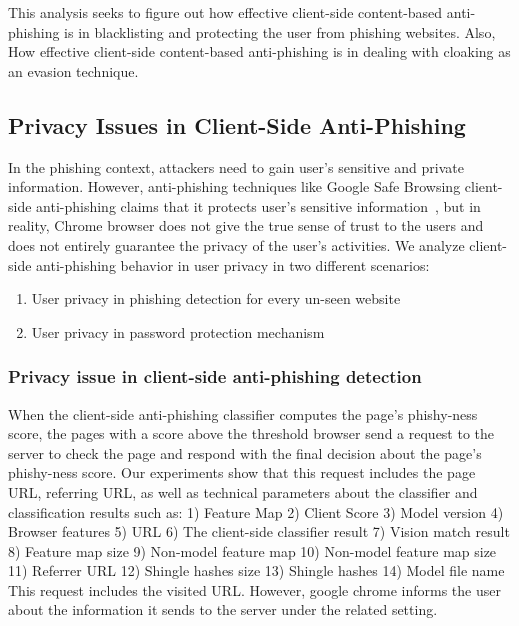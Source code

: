 This analysis seeks to figure out how effective client-side content-based anti-phishing is in blacklisting and protecting the user from phishing websites. Also, How effective client-side content-based anti-phishing is in dealing with cloaking as an evasion technique.

\subsection{Privacy Issues in Client-Side Anti-Phishing }

In the phishing context, attackers need to gain user's sensitive and private information. However, anti-phishing techniques like Google Safe Browsing client-side anti-phishing claims that it protects user's sensitive information~\cite{googlechromeprivacywhitepaper}, but in reality, Chrome browser does not give the true sense of trust to the users and does not entirely guarantee the privacy of the user's activities.
We analyze client-side anti-phishing behavior in user privacy in two different scenarios:
\begin{enumerate}
    \item User privacy in phishing detection for every un-seen website
    \item User privacy in password protection mechanism
\end{enumerate}

\subsubsection{Privacy issue in client-side anti-phishing detection} 

When the client-side anti-phishing classifier computes the page's phishy-ness score, the pages with a score above the threshold browser send a request to the server to check the page and respond with the final decision about the page's phishy-ness score. 
Our experiments show that this request includes the page URL, referring URL, as well as technical parameters about the classifier and classification results such as:
1) Feature Map
2) Client Score
3) Model version
4) Browser features
5) URL
6) The client-side classifier result
7) Vision match result
8) Feature map size
9) Non-model feature map
10) Non-model feature map size
11) Referrer URL
12) Shingle hashes size
13) Shingle hashes
14) Model file name
This request includes the visited URL.
However, google chrome informs the user about the information it sends to the server under the related setting.

